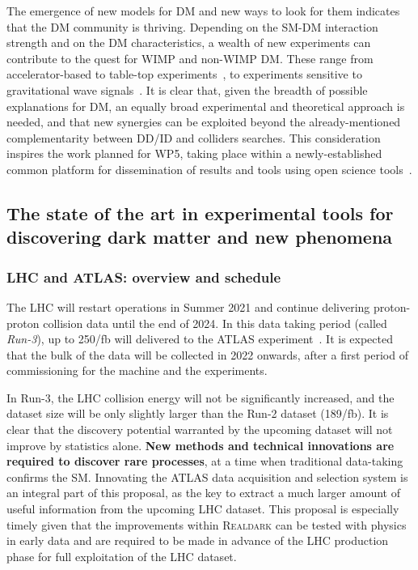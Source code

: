 The emergence of new models for DM and new ways to look for them indicates that the DM community is thriving.  
Depending on the SM-DM interaction strength and on the DM characteristics, a wealth of new experiments can contribute to the quest for WIMP and non-WIMP DM. 
These range from accelerator-based to table-top experiments~\cite{Beacham:2019nyx}, to experiments sensitive to gravitational wave signals~\cite{Bertone:2019irm,Barausse:2020rsu}. 
It is clear that, given the breadth of possible explanations for DM, an equally broad experimental and theoretical approach is needed, 
and that new synergies can be exploited beyond the already-mentioned complementarity between DD/ID and colliders searches. 
This consideration inspires the work planned for WP5, taking place within a newly-established common platform for dissemination of results and tools using open science tools~\cite{iDMEu}. 

\subsection{The state of the art in experimental tools for discovering dark matter and new phenomena}
\label{sub:stateOfTheArtExperiment}

\subsubsection{LHC and ATLAS: overview and schedule}
\smallskip

The LHC will restart operations in Summer 2021 and continue delivering proton-proton collision data until the end of 2024. In this data taking period (called \textit{Run-3}), up to 250/fb will delivered to the ATLAS experiment~\cite{ATLAS2008}.%
It is expected that the bulk of the data will be collected in 2022 onwards, after a first period of commissioning for the machine and the experiments. 

In Run-3, the LHC collision energy will not be significantly increased, and the dataset size will be only slightly larger than the Run-2 dataset (189/fb). 
It is clear that the discovery potential warranted by the upcoming dataset will not improve by statistics alone. 
\textbf{New methods and technical innovations are required to discover rare processes}, at a time when traditional data-taking confirms the SM.%
Innovating the ATLAS data acquisition and selection system is an integral part of this proposal, 
as the key to extract a much larger amount of useful information from the upcoming LHC dataset. 
This proposal is especially timely given that the improvements within \textsc{Realdark} can be tested with physics in early data and are required to be made in advance of the LHC production phase for full exploitation of the LHC dataset. 

